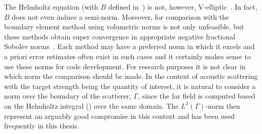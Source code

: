 The Helmholtz equation (with $B$ defined in~) is not, however, V-elliptic~\cite[p. 46]{Ihlenburg1998fea}. In fact, $B$ does not even induce a semi-norm. Moreover, for comparison with the boundary element method using volumetric norms is not only unfeasible, but these methods obtain super convergence in appropriate negative fractional Sobolev norms~\cite{Dolz2016aib}. Each method may have a preferred norm in which it excels and a priori error estimates often exist in such cases and it certainly makes sense to use these norms for code development. For research purposes it is not clear in which norm the comparison should be made. In the context of acoustic scattering with the target strength being the quantity of interest, it is natural to consider a norm over the boundary of the scatterer, $\Gamma$, since the far field is computed based on the Helmholtz integral () over the same domain. The $L^2(\Gamma)$-norm then represent an arguably good compromise in this context and has been used frequently in this thesis.







